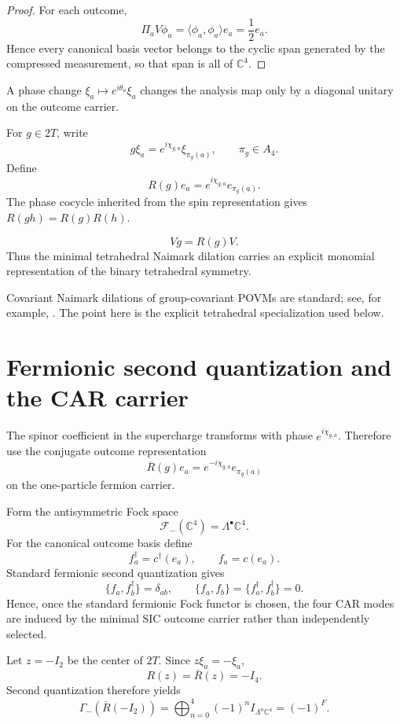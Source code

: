 \begin{proof}
For each outcome,
\[
\Pi_aV\phi_a
=
\langle\phi_a,\phi_a\rangle e_a
=
\frac12e_a.
\]
Hence every canonical basis vector belongs to the cyclic span generated by the compressed measurement, so that span is all of $\mathbb C^4$.
\end{proof}

A phase change $\xi_a\mapsto e^{i\theta_a}\xi_a$ changes the analysis map only by a diagonal unitary on the outcome carrier.

For $g\in2T$, write
\[
g\xi_a
=
e^{i\chi_{g,a}}\xi_{\pi_g(a)},
\qquad
\pi_g\in A_4.
\]
Define
\[
\boxed{
R(g)e_a
=
e^{i\chi_{g,a}}e_{\pi_g(a)}.
}
\]
The phase cocycle inherited from the spin representation gives $R(gh)=R(g)R(h)$.

\begin{theorem}\label{thm:naimark-equiv}
\[
\boxed{
Vg=R(g)V.
}
\]
Thus the minimal tetrahedral Naimark dilation carries an explicit monomial representation of the binary tetrahedral symmetry.
\end{theorem}

Covariant Naimark dilations of group-covariant POVMs are standard; see, for example, \cite{Decker2005}. The point here is the explicit tetrahedral specialization used below.

\section{Fermionic second quantization and the CAR carrier}

The spinor coefficient in the supercharge transforms with phase $e^{i\chi_{g,a}}$. Therefore use the conjugate outcome representation
\[
\overline{R}(g)e_a
=
e^{-i\chi_{g,a}}e_{\pi_g(a)}
\]
on the one-particle fermion carrier.

Form the antisymmetric Fock space
\[
\boxed{
\mathcal F_-(\mathbb C^4)
=
\Lambda^\bullet\mathbb C^4.
}
\]
For the canonical outcome basis define
\[
f_a^\dagger=c^\dagger(e_a),
\qquad
f_a=c(e_a).
\]
Standard fermionic second quantization gives
\[
\boxed{
\{f_a,f_b^\dagger\}=\delta_{ab},
\qquad
\{f_a,f_b\}=\{f_a^\dagger,f_b^\dagger\}=0.
}
\]
Hence, once the standard fermionic Fock functor is chosen, the four CAR modes are induced by the minimal SIC outcome carrier rather than independently selected.

Let $z=-I_2$ be the center of $2T$. Since $z\xi_a=-\xi_a$,
\[
R(z)=\overline R(z)=-I_4.
\]
Second quantization therefore yields
\[
\boxed{
\Gamma_-(\overline R(-I_2))
=
\bigoplus_{n=0}^4(-1)^n I_{\Lambda^n\mathbb C^4}
=
(-1)^F.
}
\]

